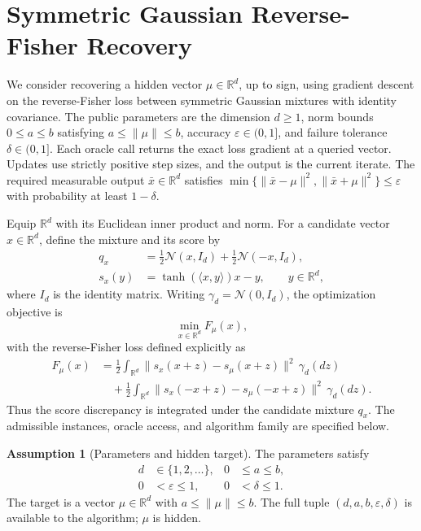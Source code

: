 \documentclass[10pt]{article}
\theoremstyle{definition}
\newtheorem{assumption}{Assumption}
\begin{document}
\section*{Symmetric Gaussian Reverse-Fisher Recovery}
We consider recovering a hidden vector $\mu\in\mathbb{R}^d$, up to sign, using gradient descent on the reverse-Fisher loss between symmetric Gaussian mixtures with identity covariance. The public parameters are the dimension $d\geq 1$, norm bounds $0\leq a\leq b$ satisfying $a\leq\|\mu\|\leq b$, accuracy $\varepsilon\in(0,1]$, and failure tolerance $\delta\in(0,1]$. Each oracle call returns the exact loss gradient at a queried vector. Updates use strictly positive step sizes, and the output is the current iterate. The required measurable output $\bar{x}\in\mathbb{R}^d$ satisfies $\min\{\|\bar{x}-\mu\|^2,\|\bar{x}+\mu\|^2\}\leq\varepsilon$ with probability at least $1-\delta$.

Equip $\mathbb{R}^d$ with its Euclidean inner product and norm. For a candidate vector $x\in\mathbb{R}^d$, define the mixture and its score by
\[
\begin{aligned}
q_x &= \tfrac12\mathcal{N}(x,I_d)+\tfrac12\mathcal{N}(-x,I_d),\\
s_x(y) &= \tanh(\langle x,y\rangle)x-y,
\qquad y\in\mathbb{R}^d,
\end{aligned}
\]
where $I_d$ is the identity matrix. Writing $\gamma_d=\mathcal{N}(0,I_d)$, the optimization objective is
\[
\min_{x\in\mathbb{R}^d} F_\mu(x),
\]
with the reverse-Fisher loss defined explicitly as
\[
\begin{aligned}
F_\mu(x)
&=\frac12\int_{\mathbb{R}^d}
 \|s_x(x+z)-s_\mu(x+z)\|^2\,\gamma_d(dz)\\
&\quad+\frac12\int_{\mathbb{R}^d}
 \|s_x(-x+z)-s_\mu(-x+z)\|^2\,\gamma_d(dz).
\end{aligned}
\]
Thus the score discrepancy is integrated under the candidate mixture $q_x$. The admissible instances, oracle access, and algorithm family are specified below.

\begin{assumption}[Parameters and hidden target]
The parameters satisfy
\[
\begin{aligned}
d&\in\{1,2,\ldots\}, & 0&\leq a\leq b,\\
0&<\varepsilon\leq1, & 0&<\delta\leq1.
\end{aligned}
\]
The target is a vector $\mu\in\mathbb{R}^d$ with $a\leq\|\mu\|\leq b$. The full tuple $(d,a,b,\varepsilon,\delta)$ is available to the algorithm; $\mu$ is hidden.
\end{assumption}
\end{document}
